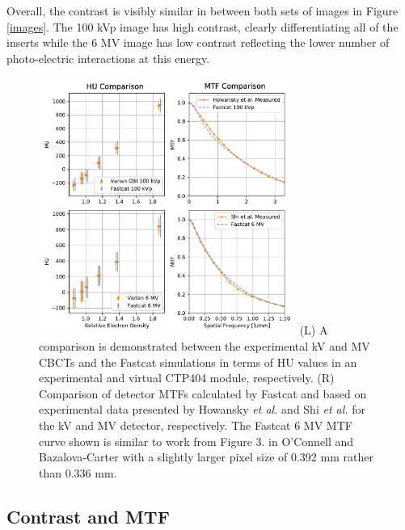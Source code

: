 Overall, the contrast is visibly similar in between both sets of images in Figure \ref{images}. The 100 kVp image has high contrast, clearly differentiating all of the inserts while the 6 MV image has low contrast reflecting the lower number of photo-electric interactions at this energy.

\begin{figure}[ht!]
  \begin{center}
  \includegraphics[width=0.75\textwidth, clip]{figures/CNR_MTF.pdf}
  {(L) A comparison is demonstrated between the experimental kV and MV CBCTs and the Fastcat simulations in terms of HU values in an experimental and virtual CTP404 module, respectively. (R) Comparison of detector MTFs calculated by Fastcat and based on experimental data presented by Howansky \textit{et al.} \cite{} and Shi \textit{et al.} \cite{Shi2018APerformance} for the kV and MV detector, respectively. The Fastcat 6 MV MTF curve shown is similar to work from Figure 3. in O’Connell and Bazalova-Carter \cite{OConnell2021FastCAT:Simulation} with a slightly larger pixel size of 0.392 mm rather than 0.336 mm.
  \label{HU} 
    }  %
    \end{center}
\end{figure}

\subsection{Contrast and MTF}

